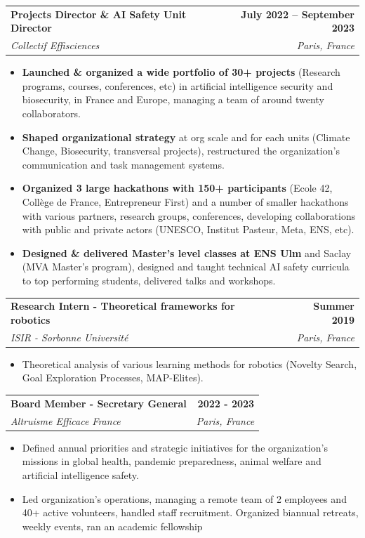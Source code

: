 \documentclass[letterpaper,11pt]{article}
\makeatletter
\newcommand{\resumeItem}[1]{
  \item\small{
    {#1 \vspace{-2pt}}
  }
}
\newcommand{\resumeSubheading}[4]{
  \vspace{-2pt}\item
    \begin{tabular*}{1.0\textwidth}[t]{l@{\extracolsep{\fill}}r}
      \textbf{#1} & \textbf{\small #2} \\
      \textit{\small#3} & \textit{\small #4} \\
    \end{tabular*}\vspace{-7pt}
}
\newcommand{\resumeItemListStart}{\begin{itemize}}
\newcommand{\resumeItemListEnd}{\end{itemize}\vspace{-5pt}}
\makeatother
\begin{document}
    \resumeSubheading
      {Projects Director \& AI Safety Unit Director}{July 2022 -- September 2023}
      {Collectif Effisciences}{Paris, France}
      \resumeItemListStart
        \resumeItem{\textbf{Launched \& organized a wide portfolio of 30+ projects} (Research programs, courses, conferences, etc) in artificial intelligence security and biosecurity, in France and Europe, managing a team of around twenty collaborators.}
        \resumeItem{\textbf{Shaped organizational strategy} at org scale and for each units (Climate Change, Biosecurity, transversal projects), restructured the organization's communication and task management systems.}
        \resumeItem{\textbf{Organized 3 large hackathons with 150+ participants} (Ecole 42, Collège de France, Entrepreneur First) and a number of smaller hackathons with various partners, research groups, conferences, developing collaborations with public and private actors (UNESCO, Institut Pasteur, Meta, ENS, etc).}
        \resumeItem{\textbf{Designed \& delivered Master's level classes at ENS Ulm} and Saclay (MVA Master's program), designed and taught technical AI safety curricula to top performing students, delivered talks and workshops.}
      \resumeItemListEnd

    \resumeSubheading
      {Research Intern - Theoretical frameworks for robotics}{Summer 2019}
      {ISIR - Sorbonne Université}{Paris, France}
      \resumeItemListStart
        \resumeItem{Theoretical analysis of various learning methods for robotics (Novelty Search, Goal Exploration Processes, MAP-Elites).}
      \resumeItemListEnd

    \resumeSubheading
      {Board Member - Secretary General}{2022 - 2023}
      {Altruisme Efficace France}{Paris, France}
      \resumeItemListStart
        \resumeItem{Defined annual priorities and strategic initiatives for the organization’s missions in global health, pandemic preparedness, animal welfare and artificial intelligence safety.}
        \resumeItem{Led organization's operations, managing a remote team of 2 employees and 40+ active volunteers, handled staff recruitment. Organized biannual retreats, weekly events, ran an academic fellowship}
      \resumeItemListEnd
\end{document}
